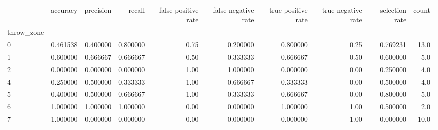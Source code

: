\begin{tabular}{lrrrrrrrrr}
\toprule
{} &  accuracy &  precision &    recall &  false positive rate &  false negative rate &  true positive rate &  true negative rate &  selection rate &  count \\
throw\_zone &           &            &           &                      &                      &                     &                     &                 &        \\
\midrule
0          &  0.461538 &   0.400000 &  0.800000 &                 0.75 &             0.200000 &            0.800000 &                0.25 &        0.769231 &   13.0 \\
1          &  0.600000 &   0.666667 &  0.666667 &                 0.50 &             0.333333 &            0.666667 &                0.50 &        0.600000 &    5.0 \\
2          &  0.000000 &   0.000000 &  0.000000 &                 1.00 &             1.000000 &            0.000000 &                0.00 &        0.250000 &    4.0 \\
4          &  0.250000 &   0.500000 &  0.333333 &                 1.00 &             0.666667 &            0.333333 &                0.00 &        0.500000 &    4.0 \\
5          &  0.400000 &   0.500000 &  0.666667 &                 1.00 &             0.333333 &            0.666667 &                0.00 &        0.800000 &    5.0 \\
6          &  1.000000 &   1.000000 &  1.000000 &                 0.00 &             0.000000 &            1.000000 &                1.00 &        0.500000 &    2.0 \\
7          &  1.000000 &   0.000000 &  0.000000 &                 0.00 &             0.000000 &            0.000000 &                1.00 &        0.000000 &   10.0 \\
\bottomrule
\end{tabular}
